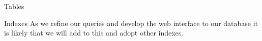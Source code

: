 \documentclass[a4paper,10pt,notitlepage]{article}
\begin{document}
\begin{section}{Tables}
\begin{subsection}{Indexes}
        As we refine our queries and develop the web interface to our database it is likely that we will add to this and adopt
        other indexes.

    \end{subsection}



\end{section}
\end{document}
